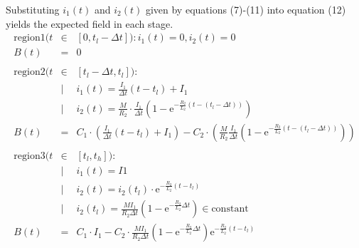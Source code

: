 Substituting $i_1(t)$ and $i_2(t)$ given by equations (7)-(11) into equation (12) yields the expected field in each stage.
\begin{eqnarray}
  \mathrm{region 1}(t&\in&[0, t_l-\Delta t]):i_1(t) = 0, i_2(t) = 0\nonumber\\
  B(t) &=& 0\\
  \nonumber\\
  \mathrm{region 2}(t&\in&[t_l-\Delta t, t_l]):\nonumber\\
  &|& i_1(t) = \frac{I_1}{\Delta t}(t-t_l) + I_1\nonumber\\
  &|& i_2(t) = \frac{M}{R_2}\cdot\frac{I_1}{\Delta t}\left( 1 - \mathrm{e}^{-\frac{R_2}{L_2}(t-(t_l-\Delta t))}\right)\nonumber\\
  B(t) &=& C_1\cdot\left(\frac{I_1}{\Delta t}(t-t_l) + I_1\right) - C_2\cdot\left( \frac{M}{R_2}\frac{I_1}{\Delta t}\left( 1 - \mathrm{e}^{-\frac{R_2}{L_2}(t-(t_l-\Delta t))}\right) \right)\\
  \nonumber\\
  \mathrm{region 3}(t&\in&[t_l, t_h]):\nonumber\\
  &|& i_1(t) = I1\nonumber\\
  &|& i_2(t) = i_2(t_l)\cdot\mathrm{e}^{-\frac{R_2}{L_2}(t-t_l)}\nonumber\\
  &|& i_2(t_l) = \frac{MI_1}{R_2\Delta t}\left( 1-\mathrm{e}^{-\frac{R_2}{L_2}\Delta t} \right)\in \mathrm{constant}\nonumber\\
  B(t) &=& C_1\cdot I_1 - C_2\cdot\frac{MI_1}{R_2\Delta t}\left( 1-\mathrm{e}^{-\frac{R_2}{L_2}\Delta t} \right)\mathrm{e}^{-\frac{R_2}{L_2}(t-t_l)}
\end{eqnarray}
